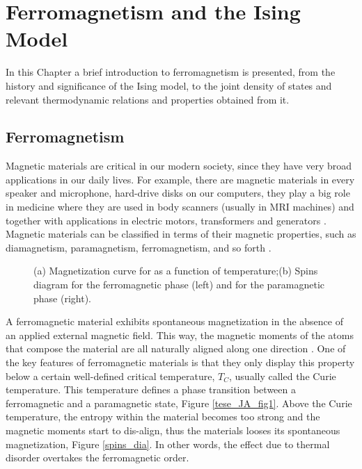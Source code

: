 \chapter{Ferromagnetism and the Ising Model}

In this Chapter  a brief introduction to ferromagnetism is presented, from the history and significance of the Ising model, to the joint density of states and relevant thermodynamic relations and properties obtained from it.

\section{Ferromagnetism}

Magnetic materials are critical in our modern society, since they have very broad applications in our daily lives. For example, there are magnetic materials in every speaker and microphone, hard-drive disks on our computers, they play a big role in medicine where they are used in body scanners (usually in MRI machines) and together with applications in electric motors, transformers and generators \cite{Gutfleisch2011}. Magnetic materials can be classified in terms of their magnetic properties, such as diamagnetism, paramagnetism, ferromagnetism, and so forth \cite{Griffiths}. 

\begin{figure}[ht]
\centering
{}
\quad
\quad
\quad
{}

\caption{(a) Magnetization curve for  as a function of temperature;(b) Spins diagram for the ferromagnetic phase (left) and for the paramagnetic phase (right).}

\end{figure}

A ferromagnetic material exhibits spontaneous magnetization in the absence of an applied external magnetic field. This way, the magnetic moments of the atoms that compose the material are all naturally aligned along one direction \cite{magnetism_book}. One of the key features of ferromagnetic materials is that they only display this property below a certain well-defined critical temperature, $T_C$, usually called the Curie temperature. This temperature defines a phase transition between a ferromagnetic and a paramagnetic state, Figure \ref{tese_JA_fig1}. 
Above the Curie temperature, the entropy within the material becomes too strong and the magnetic moments start to dis-align, thus the materials looses its spontaneous magnetization, Figure \ref{spins_dia}.  In other words, the effect due to thermal disorder overtakes the ferromagnetic order.

